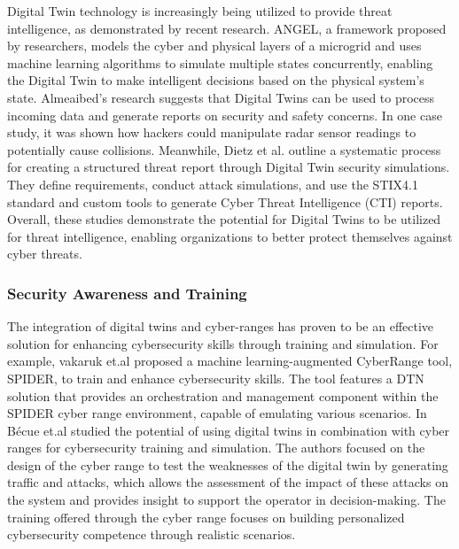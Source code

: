 Digital Twin technology is increasingly being utilized to provide threat intelligence, as demonstrated by recent research. ANGEL, a framework proposed by researchers, models the cyber and physical layers of a microgrid and uses machine learning algorithms to simulate multiple states concurrently, enabling the Digital Twin to make intelligent decisions based on the physical system's state. Almeaibed's research suggests that Digital Twins can be used to process incoming data and generate reports on security and safety concerns. In one case study, it was shown how hackers could manipulate radar sensor readings to potentially cause collisions. Meanwhile, Dietz et al. outline a systematic process for creating a structured threat report through Digital Twin security simulations. They define requirements, conduct attack simulations, and use the STIX4.1 standard and custom tools to generate Cyber Threat Intelligence (CTI) reports. Overall, these studies demonstrate the potential for Digital Twins to be utilized for threat intelligence, enabling organizations to better protect themselves against cyber threats.

\subsubsection{Security Awareness and Training}

The integration of digital twins and cyber-ranges has proven to be an effective solution for enhancing cybersecurity skills through training and simulation. For example, vakaruk et.al \cite{vakarukDigitalTwinNetwork2020} proposed a machine learning-augmented CyberRange tool, SPIDER, to train and enhance cybersecurity skills. The tool features a DTN solution that provides an orchestration and management component within the SPIDER cyber range environment, capable of emulating various scenarios.  
In \cite{becueCyberFactorySecuringIndustry40with2018} Bécue et.al studied the potential of using digital twins in combination with cyber ranges for cybersecurity training and simulation. The authors focused on the design of the cyber range to test the weaknesses of the digital twin by generating traffic and attacks, which allows the assessment of the impact of these attacks on the system and provides insight to support the operator in decision-making. The training offered through the cyber range focuses on building personalized cybersecurity competence through realistic scenarios.  

